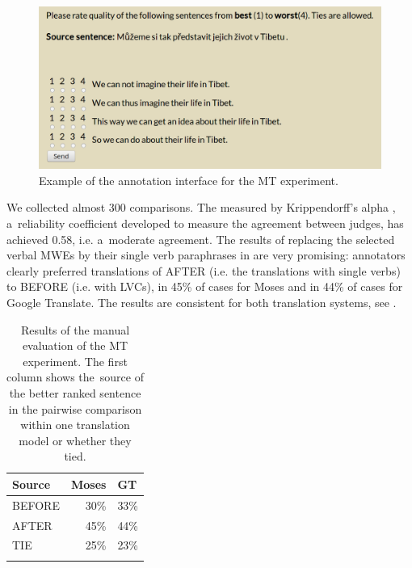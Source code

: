 \documentclass[output=paper,modfonts,nonflat]{langsci/langscibook}
\begin{document}
\begin{figure}[t]
\includegraphics[width=\textwidth]{figures/anotovatko.png} 
\caption{Example of the annotation interface for the MT experiment.}
\label{interface}
\end{figure}


We collected almost 300 comparisons. The  
measured by Krippendorff's alpha \citep{Krippendorff2007}, a~reliability 
coefficient developed to measure the agreement between judges, has achieved
0.58, i.e. a~moderate agreement. The results of replacing the selected verbal 
MWEs by their single verb paraphrases in  are very 
promising: annotators clearly preferred translations of AFTER  (i.e. the 
translations with single verbs) to BEFORE (i.e. with LVCs), in 45\% of cases 
for Moses and in 44\% of cases for Google Translate. The results are consistent
for both translation systems, see .

\begin{table}
	
	\begin{tabularx}{.8\textwidth}{XrY}
	\lsptoprule
		Source & Moses   & GT    \\ \midrule
		BEFORE & 30\%    & 33\%  \\
		AFTER  & 45\%    & 44\%  \\
		TIE    & 25\%    & 23\%  \\
	\lspbottomrule
	\end{tabularx}
	\caption{Results of the manual evaluation of the MT experiment. The first 
	column shows the~source of the better ranked sentence in the pairwise 
	comparison within one translation model or whether they tied.}
	\label{annotation}
\end{table}
\end{document}
